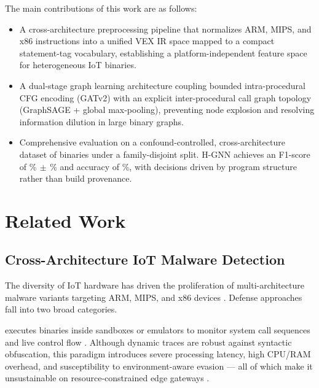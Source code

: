 \documentclass{llncs}
\begin{document}
The main contributions of this work are as follows:
\begin{itemize}
    \item {} A
    cross-architecture preprocessing pipeline that normalizes
    ARM, MIPS, and x86 instructions into a unified
    VEX IR space mapped to a compact statement-tag vocabulary, establishing
    a platform-independent feature space for heterogeneous IoT
    binaries.

    \item {}
    A dual-stage graph learning architecture coupling bounded
    intra-procedural CFG encoding (GATv2) with an explicit 
    inter-procedural call graph topology (GraphSAGE + global max-pooling),
    preventing node explosion and resolving information dilution
    in large binary graphs.

    \item {} Comprehensive
    evaluation on a confound-controlled, cross-architecture dataset of \dsTotal{} binaries under a family-disjoint split.
    H-GNN achieves an F1-score of \hgnnF\%$\,\pm\,$\hgnnFstd\% and accuracy of \hgnnAcc\%,
    with decisions driven by program structure rather than build provenance.
\end{itemize}


\section{Related Work}
\label{sec:related_work}

\subsection{Cross-Architecture IoT Malware Detection}

The diversity of IoT hardware has driven the proliferation of
multi-architecture malware variants targeting ARM, MIPS, and
x86 devices \cite{b1}. Defense approaches fall into two broad
categories.

 executes binaries inside sandboxes
or emulators to monitor system call sequences and live control
flow \cite{b3,b9}. Although dynamic traces are robust against
syntactic obfuscation, this paradigm introduces severe
processing latency, high CPU/RAM overhead, and susceptibility
to environment-aware evasion — all of which make it
unsustainable on resource-constrained edge gateways \cite{b2}.
\end{document}
